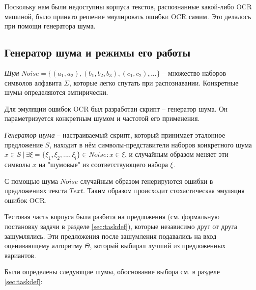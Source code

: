 Поскольку нам были недоступны корпуса текстов, распознанные какой-либо OCR машиной, было принято решение эмулировать ошибки OCR самим. Это делалось при помощи генератора шума.

\subsection{ Генератор шума и режимы его работы }

\begin{definition}
	{\textit{Шум $Noise = \{ (a_1, a_2), (b_1, b_2, b_3), (c_1, c_2), ... \}$}} -- множество наборов символов алфавита $\Sigma$, которые легко спутать при распознавании. Конкретные шумы определяются эмпирически. 
\end{definition}

Для эмуляции ошибок OCR был разработан скрипт -- генератор шума. Он параметризуется конкретным шумом и частотой его применения.

\begin{definition}
	{\textit{Генератор шума}} -- настраиваемый скрипт, который принимает эталонное предложение $S$, находит в нём символы-представители наборов конкретного шума $x \in S\ |\ \exists \xi = \{ \xi_1, \xi_2, ..., \xi_l \} \in Noise : x \in \xi$, и случайным образом меняет эти символы $x$ на "шумовые" из соответствующего набора $\xi$.
\end{definition}

С помощью шума $Noise$ случайным образом генерируются ошибки в предложениях текста $Text$. Таким образом происходит стохастическая эмуляция ошибок OCR. 

Тестовая часть корпуса была разбита на предложения (см. формальную постановку задачи в разделе \ref{sec:taskdef}), которые независимо друг от друга зашумлялись. Эти предложения после зашумления подавались на вход оценивающему алгоритму $\Theta$, который выбирал лучший из предложенных вариантов.

Были определены следующие шумы, обоснование выбора см. в разделе \ref{sec:taskdef}: 

